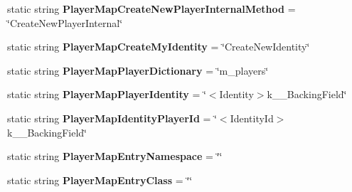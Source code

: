 \begin{DoxyCompactItemize}
\item 
\hypertarget{class_s_e_mod_a_p_i_internal_1_1_a_p_i_1_1_common_1_1_player_map_aa60adf5ab533e1fcc4326a9b99e77a4c}{}static string {\bfseries Player\+Map\+Create\+New\+Player\+Internal\+Method} = \char`\"{}Create\+New\+Player\+Internal\char`\"{}\label{class_s_e_mod_a_p_i_internal_1_1_a_p_i_1_1_common_1_1_player_map_aa60adf5ab533e1fcc4326a9b99e77a4c}

\item 
\hypertarget{class_s_e_mod_a_p_i_internal_1_1_a_p_i_1_1_common_1_1_player_map_a123c5e9ebc51f4f4664f7814bb64f851}{}static string {\bfseries Player\+Map\+Create\+My\+Identity} = \char`\"{}Create\+New\+Identity\char`\"{}\label{class_s_e_mod_a_p_i_internal_1_1_a_p_i_1_1_common_1_1_player_map_a123c5e9ebc51f4f4664f7814bb64f851}

\item 
\hypertarget{class_s_e_mod_a_p_i_internal_1_1_a_p_i_1_1_common_1_1_player_map_aead2bbae8432d96269e50336f11d6a20}{}static string {\bfseries Player\+Map\+Player\+Dictionary} = \char`\"{}m\+\_\+players\char`\"{}\label{class_s_e_mod_a_p_i_internal_1_1_a_p_i_1_1_common_1_1_player_map_aead2bbae8432d96269e50336f11d6a20}

\item 
\hypertarget{class_s_e_mod_a_p_i_internal_1_1_a_p_i_1_1_common_1_1_player_map_a328f8d44760f1aa260e3608d20eb86ce}{}static string {\bfseries Player\+Map\+Player\+Identity} = \char`\"{}$<$Identity$>$k\+\_\+\+\_\+\+Backing\+Field\char`\"{}\label{class_s_e_mod_a_p_i_internal_1_1_a_p_i_1_1_common_1_1_player_map_a328f8d44760f1aa260e3608d20eb86ce}

\item 
\hypertarget{class_s_e_mod_a_p_i_internal_1_1_a_p_i_1_1_common_1_1_player_map_a723cbaa171ca8862525a212ea2b4fe6c}{}static string {\bfseries Player\+Map\+Identity\+Player\+Id} = \char`\"{}$<$Identity\+Id$>$k\+\_\+\+\_\+\+Backing\+Field\char`\"{}\label{class_s_e_mod_a_p_i_internal_1_1_a_p_i_1_1_common_1_1_player_map_a723cbaa171ca8862525a212ea2b4fe6c}

\item 
\hypertarget{class_s_e_mod_a_p_i_internal_1_1_a_p_i_1_1_common_1_1_player_map_a60dad0637b1d2e133b2c4d7dfc813871}{}static string {\bfseries Player\+Map\+Entry\+Namespace} = \char`\"{}\char`\"{}\label{class_s_e_mod_a_p_i_internal_1_1_a_p_i_1_1_common_1_1_player_map_a60dad0637b1d2e133b2c4d7dfc813871}

\item 
\hypertarget{class_s_e_mod_a_p_i_internal_1_1_a_p_i_1_1_common_1_1_player_map_a61998b3bbf5fb08734e684211ebea9c9}{}static string {\bfseries Player\+Map\+Entry\+Class} = \char`\"{}\char`\"{}\label{class_s_e_mod_a_p_i_internal_1_1_a_p_i_1_1_common_1_1_player_map_a61998b3bbf5fb08734e684211ebea9c9}

\end{DoxyCompactItemize}
